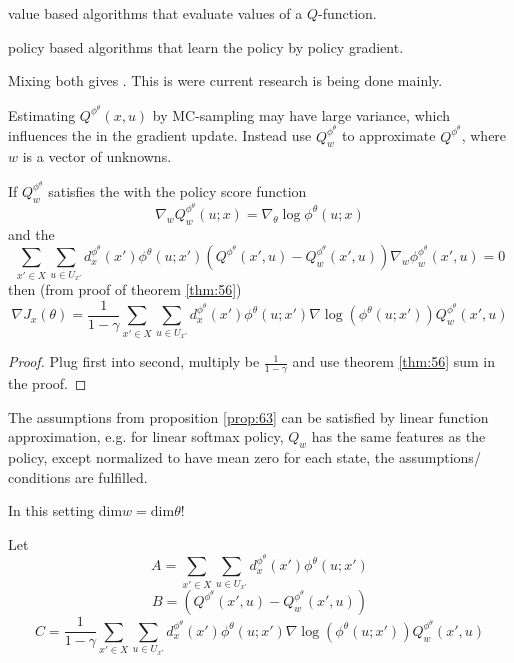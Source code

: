  value based algorithms that evaluate values of a \(Q\)-function. 

 policy based algorithms that learn the policy by policy gradient.

Mixing both gives . This is were current research is being done mainly.

Estimating \(Q^{\phi^\theta}(x,u)\) by MC-sampling may have large variance, 
which influences the  in the gradient update.
Instead use \(Q_w^{\phi^\theta}\) to approximate \(Q^{\phi^\theta}\), where \(w\) is a vector of unknowns.


\begin{proposition}\label{prop:63}
    If \(Q_w^{\phi^\theta}\) satisfies the  with 
    the policy score function 
    \[\nabla_w Q_w^{\phi^\theta}(u;x)=\nabla_\theta \log \phi^\theta(u;x)\]
    and the 
    \[\sum_{x'\in X}\sum_{u\in U_{x'}}d_x^{\phi^\theta}(x')\phi^\theta(u;x')\left(Q^{\phi^\theta}(x',u)-Q_w^{\phi^\theta}(x',u)\right)\nabla_w\phi_w^{\phi^\theta}(x',u)=0\]
    then (from proof of theorem \ref{thm:56}) 
    \[\nabla J_x(\theta)=\frac{1}{1-\gamma}\sum_{x'\in X}\sum_{u\in U_{x'}}d_x^{\phi^\theta}(x')\phi^\theta(u;x')\nabla\log (\phi^\theta(u;x'))Q_w^{\phi^\theta}(x',u)\]
\end{proposition}

\begin{proof}
    Plug first into second, multiply be \(\frac{1}{1-\gamma}\) and use theorem \ref{thm:56} sum in the proof.
\end{proof}

\begin{remark}
    The assumptions from proposition \ref{prop:63} can be satisfied by 
    linear function approximation, e.g. for linear softmax policy, \(Q_w\) has the same 
    features as the policy, except normalized to have mean zero for each state, the assumptions/ conditions 
    are fulfilled.

    In this setting $\text{dim} w=\text{dim} \theta$! 

\end{remark}

Let \[A=\sum_{x'\in X}\sum_{u\in U_{x'}}d_x^{\phi^\theta}(x')\phi^\theta(u;x')\]
\[B=\left(Q^{\phi^\theta}(x',u)-Q_w^{\phi^\theta}(x',u)\right)\]
\[C=\frac{1}{1-\gamma}\sum_{x'\in X}\sum_{u\in U_{x'}}d_x^{\phi^\theta}(x')\phi^\theta(u;x')\nabla\log (\phi^\theta(u;x'))Q_w^{\phi^\theta}(x',u)\]

